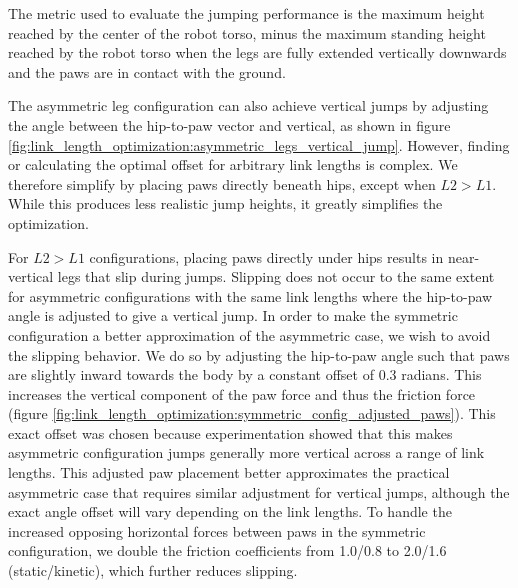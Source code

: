 The metric used to evaluate the jumping performance is the maximum height reached by the center of the robot torso, minus the maximum standing height reached by the robot torso when the legs are fully extended vertically downwards and the paws are in contact with the ground.

The asymmetric leg configuration can also achieve vertical jumps by adjusting the angle between the hip-to-paw vector and vertical, as shown in figure \ref{fig:link_length_optimization:asymmetric_legs_vertical_jump}. However, finding or calculating the optimal offset for arbitrary link lengths is complex. We therefore simplify by placing paws directly beneath hips, except when $L2>L1$. While this produces less realistic jump heights, it greatly simplifies the optimization.

For $L2>L1$ configurations, placing paws directly under hips results in near-vertical legs that slip during jumps. Slipping does not occur to the same extent for asymmetric configurations with the same link lengths where the hip-to-paw angle is adjusted to give a vertical jump. In order to make the symmetric configuration a better approximation of the asymmetric case, we wish to avoid the slipping behavior. We do so by adjusting the hip-to-paw angle such that paws are slightly inward towards the body by a constant offset of 0.3 radians. This increases the vertical component of the paw force and thus the friction force (figure \ref{fig:link_length_optimization:symmetric_config_adjusted_paws}). This exact offset was chosen because experimentation showed that this makes asymmetric configuration jumps generally more vertical across a range of link lengths. This adjusted paw placement better approximates the practical asymmetric case that requires similar adjustment for vertical jumps, although the exact angle offset will vary depending on the link lengths. To handle the increased opposing horizontal forces between paws in the symmetric configuration, we double the friction coefficients from 1.0/0.8 to 2.0/1.6 (static/kinetic), which further reduces slipping.

